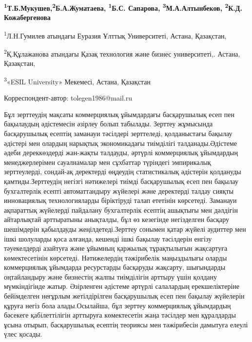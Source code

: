
\begin{articleheader}

{\bfseries \textsuperscript{1}Т.Б.Мукушев\textsuperscript{\envelope },\textsuperscript{2}Б.А.Жуматаева, \textsuperscript{1}Б.С.
Сапарова, \textsuperscript{3}М.А.Алтынбеков,
\textsuperscript{2}К.Д. Кожабергенова }
\end{articleheader}
\begin{affiliation}

\textsuperscript{1}Л.Н.Гумилев атындағы Еуразия Ұлттық Университеті,
Астана, Қазақстан,

\textsuperscript{2}Қ.Құлажанова атындағы Қазақ технология және бизнес
университеті,. Астана, Қазақстан,

\textsuperscript{3}«ESIL University» Мекемесі, Астана, Қазақстан

\raggedright{\bfseries \textsuperscript{\envelope }}Корреспондент-автор: tolegen1986@mail.ru
\end{affiliation}

Бұл зерттеудің мақсаты коммерциялық ұйымдардағы басқарушылық есеп пен
бақылаудың әдістемесін әзірлеу болып табылады. Зерттеу жұмысында
басқарушылық есептің заманауи тәсілдері зерттеледі, қолданыстағы бақылау
әдістері мен олардың нарықтық экономикадағы тиімділігі
талданады.Әдістеме әдеби дереккөздерді жан-жақты талдауды, әртүрлі
коммерциялық ұйымдардың менеджерлерімен сауалнамалар мен сұхбаттар
түріндегі эмпирикалық зерттеулерді, сондай-ақ деректерді өңдеудің
статистикалық әдістерін қолдануды қамтиды.Зерттеудің негізгі нәтижелері
тиімді басқарушылық есеп пен бақылау бухгалтерлік есепті автоматтандыру
жүйелері және деректерді талдау сияқты инновациялық технологияларды
біріктіруді талап ететінін көрсетеді. Заманауи ақпараттық жүйелерді
пайдалану бухгалтерлік есептің ашықтығы мен дәлдігін айтарлықтай
арттыратыны анықталды, бұл өз кезегінде негізделген басқару шешімдерін
қабылдауды жеңілдетеді.Зерттеу сонымен қатар жүйелі аудиттер мен ішкі
шолуларды қоса алғанда, кешенді ішкі бақылау тәсілдерін енгізу
тәуекелдерді азайтуға және ұйымның қаржылық тұрақтылығын жақсартуға
көмектесетінін көрсетеді. Нәтижелердің тәжірибелік маңыздылығы оларды
коммерциялық ұйымдарда ресурстарды басқаруды жақсарту, шығындарды
оңтайландыру және бизнестің жалпы тиімділігін арттыру үшін қолдану
мүмкіндігінде жатыр. Әзірленген әдістеме әртүрлі салалардың
ерекшеліктеріне бейімделген неғұрлым жетілдірілген басқарушылық есеп пен
бақылау жүйелерін құруға негіз бола алады.Осылайша, бұл зерттеу
коммерциялық ұйымдардың бәсекеге қабілеттілігін арттыруға көмектесетін
жаңа тәсілдер мен құралдарды ұсына отырып, басқарушылық есептің теориясы
мен тәжірибесін дамытуға елеулі үлес қосады.

